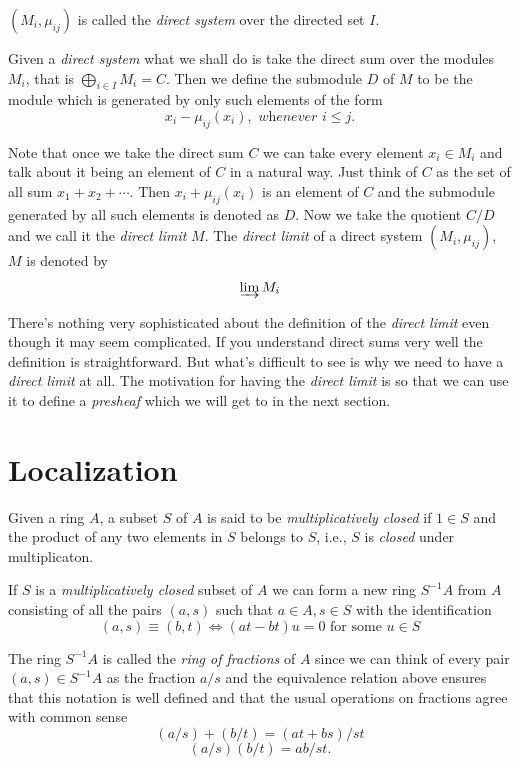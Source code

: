 \documentclass[]{report}
\newcommand\byS{S^{-1}}
\begin{document}
$(M_i,\mu_{ij})$ is called the \textit{direct system} over the directed set $I$.

Given a \textit{direct system} what we shall do is take the direct sum over the modules $M_i$, that is $\bigoplus_{i\in I} M_i = C$. Then we define the submodule $D$ of $M$ to be the module which is generated by only such elements of the form
$$x_i - \mu_{ij}(x_i), \textit{ whenever } i\leq j.$$

Note that once we take the direct sum $C$ we can take every element $x_i\in M_i$ and talk about it being an element of $C$ in a natural way. Just think of $C$ as the set of all sum $x_1  + x_2 + \cdots$. Then $x_i + \mu_{ij}(x_i)$ is an element of $C$ and the submodule generated by all such elements is denoted as $D$. Now we take the quotient $C/D$ and we call it the \textit{direct limit} $M$. The \textit{direct limit} of a direct system $(M_i, \mu_{ij})$, $M$ is denoted by
    $$\varinjlim M_i$$

There's nothing very sophisticated about the definition of the \textit{direct limit} even though it may seem complicated. If you understand direct sums very well the definition is straightforward. But what's difficult to see is why we need to have a \textit{direct limit} at all. The motivation for having the \textit{direct limit} is so that we can use it to define a \textit{presheaf} which we will get to in the next section. 


\chapter{Localization}

Given a ring $A$, a subset $S$ of $A$ is said to be \textit{multiplicatively closed} if $1\in S$ and the product of any two elements in $S$ belongs to $S$, i.e., $S$ is \textit{closed} under multiplicaton. 

If $S$ is a \textit{multiplicatively closed} subset of $A$ we can form a new ring $\byS A$ from $A$ consisting of all the pairs $(a,s)$ such that $a\in A, s\in S$ with the identification
    $$(a,s) \equiv (b,t) \Leftrightarrow (at - bt)u = 0 \text{ for some } u \in S$$

    The ring $\byS A$ is called the \textit{ring of fractions} of $A$ since we can think of every pair $(a,s) \in \byS A$ as the fraction $a/s$ and the equivalence relation above ensures that this notation is well defined and that the usual operations on fractions agree with common sense
    $$(a/s) + (b/t) = (at + bs)/st$$
    $$(a/s)(b/t) = ab/st.$$
\end{document}
